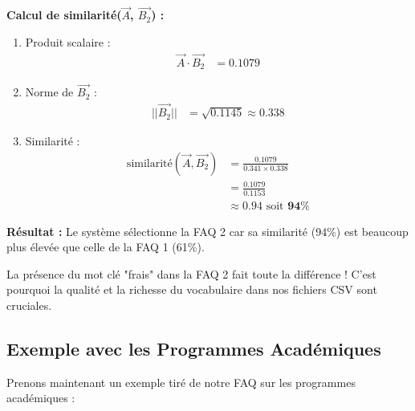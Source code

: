 \documentclass[11pt,a4paper]{article}
\begin{document}
\begin{exemple}
\textbf{Calcul de similarité($\vec{A}$, $\vec{B_2}$) :}

\begin{enumerate}
    \item Produit scalaire : 
    \begin{align*}
    \vec{A} \cdot \vec{B_2} 
    &= 0.1079
    \end{align*}
    
    \item Norme de $\vec{B_2}$ :
    \begin{align*}
    ||\vec{B_2}|| 
    &= \sqrt{0.1145} \approx 0.338
    \end{align*}
    
    \item Similarité :
    \begin{align*}
    \text{similarité}(\vec{A}, \vec{B_2}) &= \frac{0.1079}{0.341 \times 0.338} \\
    &= \frac{0.1079}{0.1153} \\
    &\approx 0.94 \text{ soit } \mathbf{94\%}
    \end{align*}
\end{enumerate}

\vspace{0.1cm}
\textbf{Résultat :} Le système sélectionne la FAQ 2 car sa similarité (94\%) est beaucoup plus élevée que celle de la FAQ 1 (61\%).

\end{exemple}

\begin{important}[Conclusion]
La présence du mot clé "frais" dans la FAQ 2 fait toute la différence ! C'est pourquoi la qualité et la richesse du vocabulaire dans nos fichiers CSV sont cruciales.
\end{important}

\subsection{Exemple avec les Programmes Académiques}

Prenons maintenant un exemple tiré de notre FAQ sur les programmes académiques :
\end{document}
